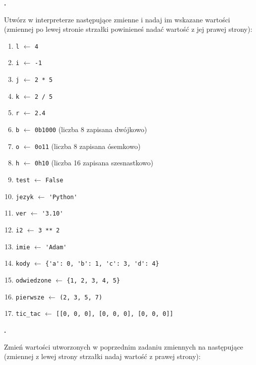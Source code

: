 \documentclass[a4paper]{article}
\begin{document}
\textbf{.}\addtocounter{zadanie}{1}
Utwórz w interpreterze następujące zmienne i nadaj im wskazane wartości (zmiennej po lewej stronie strzałki powinieneś nadać wartość z jej prawej strony):

\begin{enumerate}[label=\arabic*.]
    \item \verb|l| $\leftarrow$ \verb|4|
    \item \verb|i| $\leftarrow$ \verb|-1|
    \item \verb|j| $\leftarrow$ \verb|2 * 5|
    \item \verb|k| $\leftarrow$ \verb|2 / 5|
    \item \verb|r| $\leftarrow$ \verb|2.4|
    \item \verb|b| $\leftarrow$ \verb|0b1000| (liczba 8 zapisana dwójkowo)
    \item \verb|o| $\leftarrow$ \verb|0o11| (liczba 8 zapisana ósemkowo)
    \item \verb|h| $\leftarrow$ \verb|0h10| (liczba 16 zapisana szesnastkowo)
    \item \verb|test| $\leftarrow$ \verb|False|
    \item \verb|jezyk| $\leftarrow$ \verb|'Python'|
    \item \verb|ver| $\leftarrow$ \verb|'3.10'|
    \item \verb|i2| $\leftarrow$ \verb|3 ** 2|
    \item \verb|imie| $\leftarrow$ \verb|'Adam'|
    \item \verb|kody| $\leftarrow$ \verb|{'a': 0, 'b': 1, 'c': 3, 'd': 4}|
    \item \verb|odwiedzone| $\leftarrow$ \verb|{1, 2, 3, 4, 5}|
    \item \verb|pierwsze| $\leftarrow$ \verb|(2, 3, 5, 7)|
    \item \verb|tic_tac| $\leftarrow$ \verb|[[0, 0, 0], [0, 0, 0], [0, 0, 0]]|
\end{enumerate}

\textbf{.}\addtocounter{zadanie}{1} Zmień wartości utworzonych w poprzednim zadaniu zmiennych na następujące (zmiennej z lewej strony strzałki nadaj wartość z prawej strony):
\end{document}
